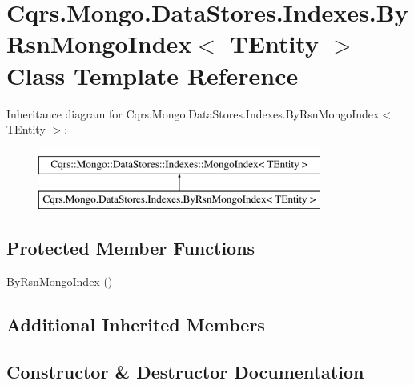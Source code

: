 \hypertarget{classCqrs_1_1Mongo_1_1DataStores_1_1Indexes_1_1ByRsnMongoIndex}{}\section{Cqrs.\+Mongo.\+Data\+Stores.\+Indexes.\+By\+Rsn\+Mongo\+Index$<$ T\+Entity $>$ Class Template Reference}
\label{classCqrs_1_1Mongo_1_1DataStores_1_1Indexes_1_1ByRsnMongoIndex}
Inheritance diagram for Cqrs.\+Mongo.\+Data\+Stores.\+Indexes.\+By\+Rsn\+Mongo\+Index$<$ T\+Entity $>$\+:\begin{figure}[H]
\begin{center}
\leavevmode
\includegraphics[height=2.000000cm]{classCqrs_1_1Mongo_1_1DataStores_1_1Indexes_1_1ByRsnMongoIndex}
\end{center}
\end{figure}
\subsection*{Protected Member Functions}
\begin{DoxyCompactItemize}
\item 
\hyperlink{classCqrs_1_1Mongo_1_1DataStores_1_1Indexes_1_1ByRsnMongoIndex_ae28ab1125093922dc3eeb3a19b821224}{By\+Rsn\+Mongo\+Index} ()
\end{DoxyCompactItemize}
\subsection*{Additional Inherited Members}


\subsection{Constructor \& Destructor Documentation}
\mbox{\label{classCqrs_1_1Mongo_1_1DataStores_1_1Indexes_1_1ByRsnMongoIndex_ae28ab1125093922dc3eeb3a19b821224}} 
